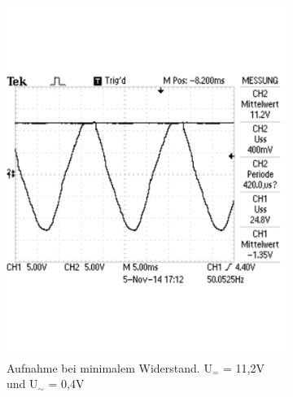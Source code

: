 \documentclass[12pt,a4paper]{article}
\begin{document}
\begin{figure}[H]
        \centering
        \begin{subfigure}[b]{0.48\textwidth}
                \includegraphics[width=\textwidth , scale = 0.4]{2_5_1000F_1.pdf}
                \caption[Aufnahme bei minimalem Widerstand. U$_{=}$ = 11,2V und U$_\sim$ = 0,4V]{Aufnahme bei minimalem Widerstand. U$_{=}$ = 11,2V und U$_\sim$ = 0,4V}
 				 \label{fig:2_5_1000F_1}
        \end{subfigure}%
        \hfill
        \begin{subfigure}[b]{0.48\textwidth}

\end{subfigure}
\end{figure}
\end{document}
